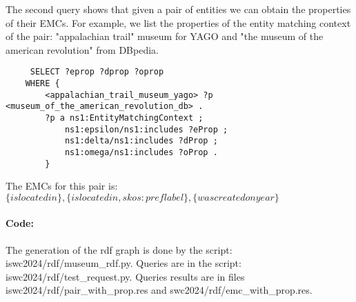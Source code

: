 \documentclass[runningheads]{llncs}
\begin{document}
The second query shows that given a pair of entities we can obtain the properties of their EMCs.
For example, we list the properties of the entity matching context of the pair: "appalachian trail" museum for YAGO and "the museum of the american revolution" from DBpedia.

\begin{lstlisting}
     SELECT ?eprop ?dprop ?oprop
    WHERE {
        <appalachian_trail_museum_yago> ?p <museum_of_the_american_revolution_db> .
        ?p a ns1:EntityMatchingContext ;
            ns1:epsilon/ns1:includes ?eProp ;
            ns1:delta/ns1:includes ?dProp ;
            ns1:omega/ns1:includes ?oProp .
        }
\end{lstlisting}
The EMCs for this pair is: $\{islocatedin\},\{islocatedin,skos:preflabel\},\{wascreatedonyear\}$

\paragraph{Code:}
The generation of the rdf graph is done by the script: iswc2024/rdf/museum\_rdf.py.
Queries are in the script: iswc2024/rdf/test\_request.py.
Queries results are in files iswc2024/rdf/pair\_with\_prop.res and swc2024/rdf/emc\_with\_prop.res.
\end{document}
